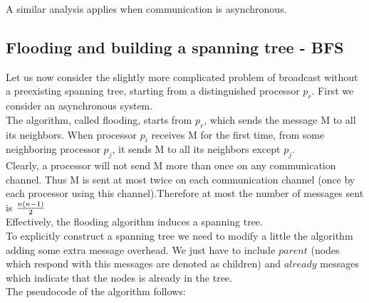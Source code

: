 \documentclass{article}
\begin{document}
A similar analysis applies when communication is asynchronous. 



\subsection{Flooding and building a spanning tree - BFS}
Let us now consider the slightly more complicated problem of broadcast 
without a preexisting spanning tree, starting from a distinguished processor $p_r$. First 
we consider an asynchronous system. \\
The algorithm, called flooding, starts from $p_r$, which sends the message M to all 
its neighbors. When processor $p_i$ receives M for the first time, from some neighboring processor $p_j$, it sends M to all its 
neighbors except $p_j$.\\
Clearly, a processor will not send M more than once on any communication 
channel. Thus M is sent at most twice on each communication channel (once 
by each processor using this channel).Therefore at most the number of messages sent is ${n(n-1) \over 2}$\\
Effectively, the flooding algorithm induces a spanning tree.\\
To explicitly construct a spanning tree we need to modify a little the algorithm adding some extra message overhead. We just have to include $parent$ (nodes which respond with this messages are denoted as children)  and $already$ messages which indicate that the nodes is already in the tree.\\

The pseudocode of the algorithm follows:
\end{document}
